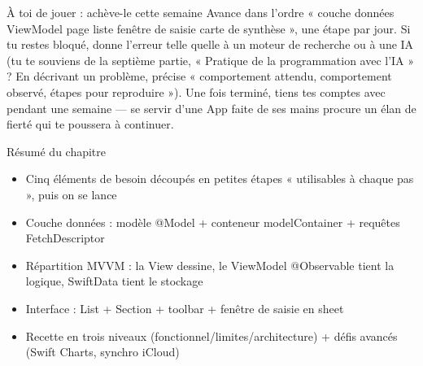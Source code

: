 \begin{tcbpractice}{À toi de jouer : achève-le cette semaine}
Avance dans l'ordre « couche données ViewModel page liste fenêtre de saisie carte de synthèse », une étape par jour. Si tu restes bloqué, donne l'erreur telle quelle à un moteur de recherche ou à une IA (tu te souviens de la septième partie, « Pratique de la programmation avec l'IA » ? En décrivant un problème, précise « comportement attendu, comportement observé, étapes pour reproduire »). Une fois terminé, tiens tes comptes avec pendant une semaine — se servir d'une App faite de ses mains procure un élan de fierté qui te poussera à continuer.

\end{tcbpractice}

\begin{tcbsummary}{Résumé du chapitre}
\begin{itemize}
  \item Cinq éléments de besoin découpés en petites étapes « utilisables à chaque pas », puis on se lance
  \item Couche données : modèle @Model + conteneur modelContainer + requêtes FetchDescriptor
  \item Répartition MVVM : la View dessine, le ViewModel @Observable tient la logique, SwiftData tient le stockage
  \item Interface : List + Section + toolbar + fenêtre de saisie en sheet
  \item Recette en trois niveaux (fonctionnel/limites/architecture) + défis avancés (Swift Charts, synchro iCloud)
\end{itemize}

\end{tcbsummary}
